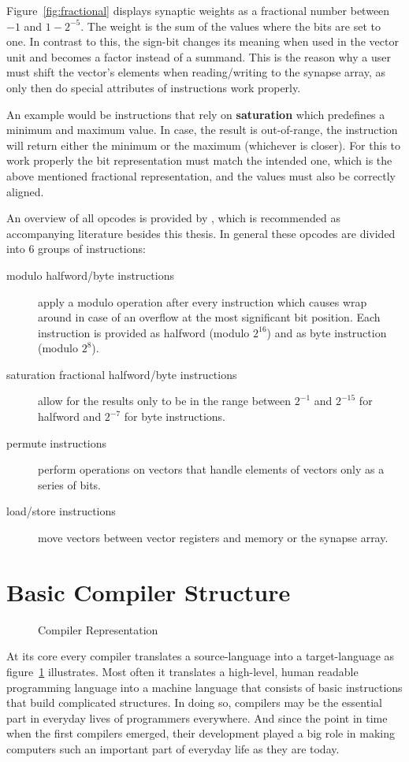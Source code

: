 Figure~\ref{fig:fractional} displays synaptic weights as a fractional number between $-1$ and $1-2^{-5}$.
The weight is the sum of the values where the bits are set to one.
In contrast to this, the sign-bit changes its meaning when used in the vector unit and becomes a factor instead of a summand.
This is the reason why a user must shift the vector's elements when reading/writing to the synapse array, as only then do special attributes of instructions work properly.

An example would be instructions that rely on \textbf{saturation} which predefines a minimum and maximum value.
In case, the result is out-of-range, the instruction will return either the minimum or the maximum (whichever is closer).
For this to work properly the bit representation must match the intended one, which is the above mentioned fractional representation, and the values must also be correctly aligned.

An overview of all opcodes is provided by \cite{nuxmanual}, which is recommended as accompanying literature besides this thesis.
In general these opcodes are divided into 6 groups of instructions:
\begin{description}
    \item[modulo halfword/byte instructions] apply a modulo operation after every instruction which causes wrap around in case of an overflow at the most significant bit position.
        Each instruction is provided as halfword (modulo $2^{16}$) and as byte instruction (modulo $2^{8}$).
    \item[saturation fractional halfword/byte instructions] allow for the results only to be in the range between $2^{-1}$ and $2^{-15}$ for halfword and $2^{-7}$ for byte instructions.
    \item[permute instructions] perform operations on vectors that handle elements of vectors only as a series of bits.
    \item[load/store instructions] move vectors between vector registers and memory or the synapse array.
\end{description}


\section{Basic Compiler Structure}
\label{section:compiler}

\begin{figure}
    \centering
        
        \caption{\label{fig:compiler} Compiler Representation}
\end{figure}
At its core every compiler translates a source-language into a target-language as figure~\ref{fig:compiler} illustrates.
Most often it translates a high-level, human readable programming language into a machine language that consists of basic instructions that build complicated structures.
In doing so, compilers may be the essential part in everyday lives of programmers everywhere.
And since the point in time when the first compilers emerged, their development played a big role in making computers such an important part of everyday life as they are today.

